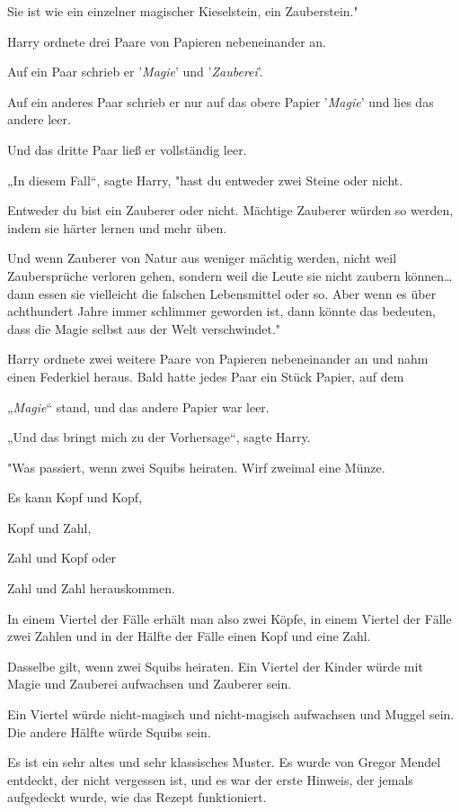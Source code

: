 {Sie ist wie ein einzelner magischer Kieselstein, ein Zauberstein."

Harry ordnete drei Paare von Papieren nebeneinander an.

Auf ein Paar schrieb er '\emph{Magie}' und '\emph{Zauberei}'.

Auf ein anderes Paar schrieb er nur auf das obere Papier '\emph{Magie}' und lies das andere leer.

Und das dritte Paar ließ er vollständig leer.

„In diesem Fall“, sagte Harry, "hast du entweder zwei Steine oder nicht.

Entweder du bist ein Zauberer oder nicht. Mächtige Zauberer würden so werden, indem sie härter lernen und mehr üben.

Und wenn Zauberer von Natur aus weniger mächtig werden, nicht weil Zaubersprüche verloren gehen, sondern weil die Leute sie nicht zaubern können… dann essen sie vielleicht die falschen Lebensmittel oder so. Aber wenn es über achthundert Jahre immer schlimmer geworden ist, dann könnte das bedeuten, dass die Magie selbst aus der Welt verschwindet."

Harry ordnete zwei weitere Paare von Papieren nebeneinander an und nahm einen Federkiel heraus. Bald hatte jedes Paar ein Stück Papier, auf dem

„\emph{Magie}“ stand, und das andere Papier war leer.

„Und das bringt mich zu der Vorhersage“, sagte Harry.

"Was passiert, wenn zwei Squibs heiraten. Wirf zweimal eine Münze.

Es kann Kopf und Kopf,

Kopf und Zahl,

Zahl und Kopf oder

Zahl und Zahl herauskommen.

In einem Viertel der Fälle erhält man also zwei Köpfe, in einem Viertel der Fälle zwei Zahlen und in der Hälfte der Fälle einen Kopf und eine Zahl.

Dasselbe gilt, wenn zwei Squibs heiraten. Ein Viertel der Kinder würde mit Magie und Zauberei aufwachsen und Zauberer sein.

Ein Viertel würde nicht-magisch und nicht-magisch aufwachsen und Muggel sein. Die andere Hälfte würde Squibs sein.

Es ist ein sehr altes und sehr klassisches Muster. Es wurde von Gregor Mendel entdeckt, der nicht vergessen ist, und es war der erste Hinweis, der jemals aufgedeckt wurde, wie das Rezept funktioniert.

}
